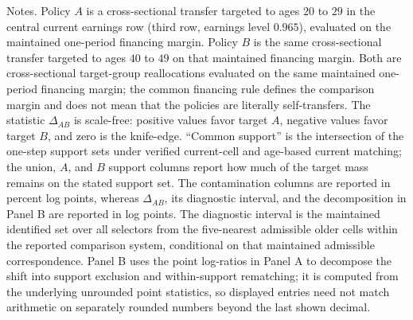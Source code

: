 \begin{table}[t]
\begin{minipage}{0.98\textwidth}
\footnotesize Notes. Policy $A$ is a cross-sectional transfer targeted to ages $20$ to $29$ in the central current earnings row (third row, earnings level $0.965$), evaluated on the maintained one-period financing margin. Policy $B$ is the same cross-sectional transfer targeted to ages $40$ to $49$ on that maintained financing margin. Both are cross-sectional target-group reallocations evaluated on the same maintained one-period financing margin; the common financing rule defines the comparison margin and does not mean that the policies are literally self-transfers. The statistic $\Delta_{AB}$ is scale-free: positive values favor target $A$, negative values favor target $B$, and zero is the knife-edge. ``Common support'' is the intersection of the one-step support sets under verified current-cell and age-based current matching; the union, $A$, and $B$ support columns report how much of the target mass remains on the stated support set. The contamination columns are reported in percent log points, whereas $\Delta_{AB}$, its diagnostic interval, and the decomposition in Panel B are reported in log points. The diagnostic interval is the maintained identified set over all selectors from the five-nearest admissible older cells within the reported comparison system, conditional on that maintained admissible correspondence. Panel B uses the point log-ratios in Panel A to decompose the shift into support exclusion and within-support rematching; it is computed from the underlying unrounded point statistics, so displayed entries need not match arithmetic on separately rounded numbers beyond the last shown decimal.
\end{minipage}
\end{table}
